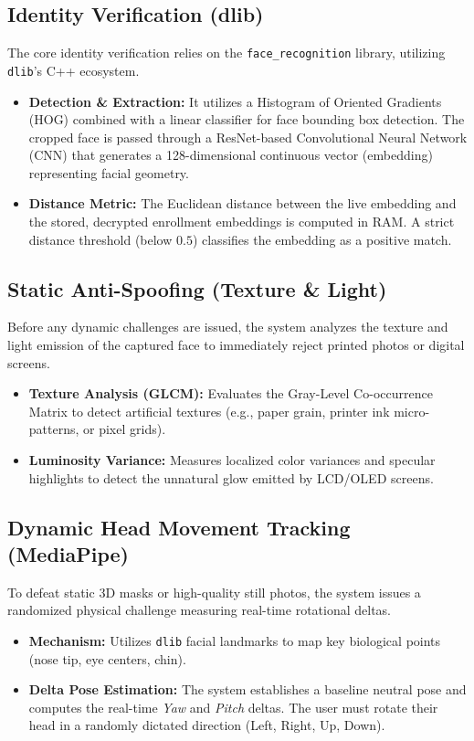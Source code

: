 \documentclass[12pt,a4paper]{article}
\begin{document}
\subsection{Identity Verification (dlib)}
The core identity verification relies on the \texttt{face\_recognition} library, utilizing \texttt{dlib}'s C++ ecosystem.
\begin{itemize}
    \item \textbf{Detection \& Extraction:} It utilizes a Histogram of Oriented Gradients (HOG) combined with a linear classifier for face bounding box detection. The cropped face is passed through a ResNet-based Convolutional Neural Network (CNN) that generates a 128-dimensional continuous vector (embedding) representing facial geometry.
    \item \textbf{Distance Metric:} The Euclidean distance between the live embedding and the stored, decrypted enrollment embeddings is computed in RAM. A strict distance threshold (below $0.5$) classifies the embedding as a positive match.
\end{itemize}

\subsection{Static Anti-Spoofing (Texture \& Light)}
Before any dynamic challenges are issued, the system analyzes the texture and light emission of the captured face to immediately reject printed photos or digital screens.
\begin{itemize}
    \item \textbf{Texture Analysis (GLCM):} Evaluates the Gray-Level Co-occurrence Matrix to detect artificial textures (e.g., paper grain, printer ink micro-patterns, or pixel grids).
    \item \textbf{Luminosity Variance:} Measures localized color variances and specular highlights to detect the unnatural glow emitted by LCD/OLED screens.
\end{itemize}

\subsection{Dynamic Head Movement Tracking (MediaPipe)}
To defeat static 3D masks or high-quality still photos, the system issues a randomized physical challenge measuring real-time rotational deltas.
\begin{itemize}
    \item \textbf{Mechanism:} Utilizes \texttt{dlib} facial landmarks to map key biological points (nose tip, eye centers, chin). 
    \item \textbf{Delta Pose Estimation:} The system establishes a baseline neutral pose and computes the real-time \textit{Yaw} and \textit{Pitch} deltas. The user must rotate their head in a randomly dictated direction (Left, Right, Up, Down).
\end{itemize}
\end{document}
